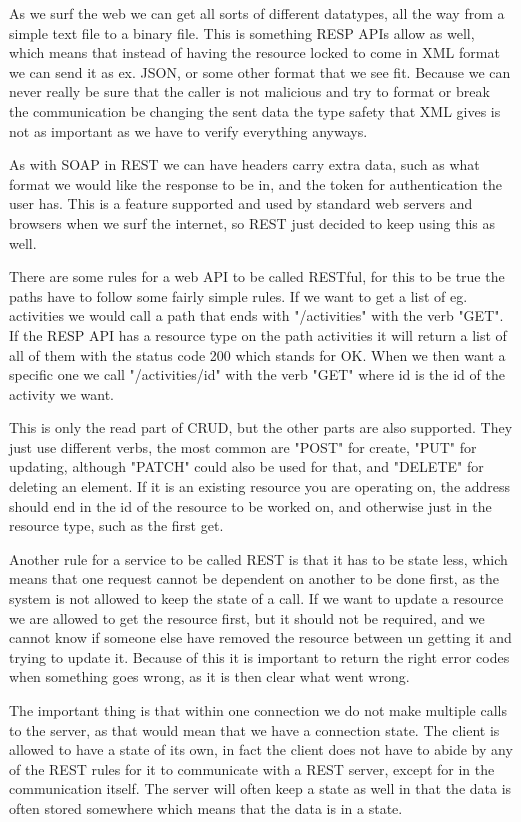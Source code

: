 As we surf the web we can get all sorts of different datatypes, all the way from a simple text file to a binary file. This is something RESP APIs allow as well, which means that instead of having the resource locked to come in XML format we can send it as ex. JSON, or some other format that we see fit\cite{rest:basic}. Because we can never really be sure that the caller is not malicious and try to format or break the communication be changing the sent data the type safety that XML gives is not as important as we have to verify everything anyways.

As with SOAP in REST we can have headers carry extra data, such as what format we would like the response to be in, and the token for authentication the user has. This is a feature supported and used by standard web servers and browsers when we surf the internet, so REST just decided to keep using this as well.

There are some rules for a web API to be called RESTful\cite{rest:msdn}, for this to be true the paths have to follow some fairly simple rules. If we want to get a list of eg. activities we would call a path that ends with "/activities" with the verb "GET". If the RESP API has a resource type on the path activities it will return a list of all of them with the status code 200 which stands for OK. When we then want a specific one we call "/activities/id" with the verb "GET" where id is the id of the activity we want.

This is only the read part of CRUD, but the other parts are also supported. They just use different verbs, the most common are "POST" for create, "PUT" for updating, although "PATCH" could also be used for that, and "DELETE" for deleting an element. If it is an existing resource you are operating on, the address should end in the id of the resource to be worked on, and otherwise just in the resource type, such as the first get.

Another rule for a service to be called REST is that it has to be state less, which means that one request cannot be dependent on another to be done first, as the system is not allowed to keep the state of a call. If we want to update a resource we are allowed to get the resource first, but it should not be required, and we cannot know if someone else have removed the resource between un getting it and trying to update it. Because of this it is important to return the right error codes when something goes wrong, as it is then clear what went wrong.

The important thing is that within one connection we do not make multiple calls to the server, as that would mean that we have a connection state. The client is allowed to have a state of its own, in fact the client does not have to abide by any of the REST rules for it to communicate with a REST server, except for in the communication itself. The server will often keep a state as well in that the data is often stored somewhere which means that the data is in a state.

